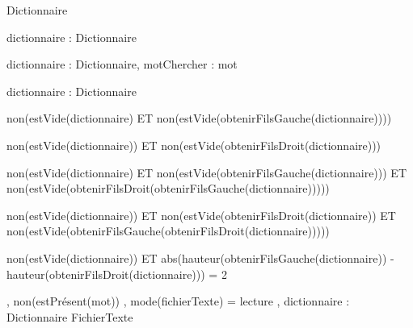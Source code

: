 \begin{algorithme}
		{}%
		{Dictionnaire}
	
		{dictionnaire : Dictionnaire}%
		{\booleen}
	
		{dictionnaire : Dictionnaire, motChercher : mot}%
		{\booleen}

		{dictionnaire : Dictionnaire}%
		{\entier}

		{}%
		{non(estVide(dictionnaire) ET non(estVide(obtenirFilsGauche(dictionnaire))))}

		{}%
		{non(estVide(dictionnaire)) ET non(estVide(obtenirFilsDroit(dictionnaire)))}

		{}
		{non(estVide(dictionnaire) ET non(estVide(obtenirFilsGauche(dictionnaire))) ET non(estVide(obtenirFilsDroit(obtenirFilsGauche(dictionnaire)))))}
	
		{}%
		{non(estVide(dictionnaire)) ET non(estVide(obtenirFilsDroit(dictionnaire)) ET non(estVide(obtenirFilsGauche(obtenirFilsDroit(dictionnaire)))))}

		{}%
		{non(estVide(dictionnaire)) ET abs(hauteur(obtenirFilsGauche(dictionnaire)) - hauteur(obtenirFilsDroit(dictionnaire))) = 2}

		{,}
		{non(estPrésent(mot))}
		{, }%
		{mode(fichierTexte) = lecture}
		{, }
		{dictionnaire : Dictionnaire}%
		{FichierTexte}
\end{algorithme}
